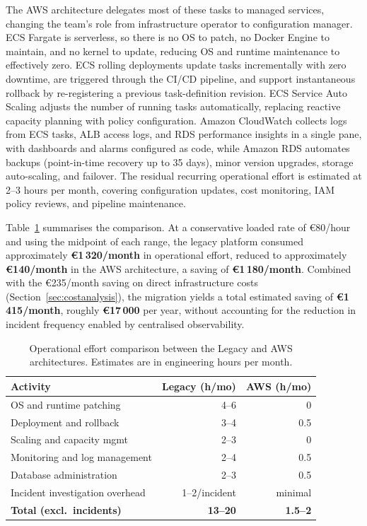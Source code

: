The AWS architecture delegates most of these tasks to managed services, changing the team's role from infrastructure operator to configuration manager. ECS Fargate is serverless, so there is no OS to patch, no Docker Engine to maintain, and no kernel to update, reducing OS and runtime maintenance to effectively zero. ECS rolling deployments update tasks incrementally with zero downtime, are triggered through the CI/CD pipeline, and support instantaneous rollback by re-registering a previous task-definition revision. ECS Service Auto Scaling adjusts the number of running tasks automatically, replacing reactive capacity planning with policy configuration. Amazon CloudWatch collects logs from ECS tasks, ALB access logs, and RDS performance insights in a single pane, with dashboards and alarms configured as code, while Amazon RDS automates backups (point-in-time recovery up to 35 days), minor version upgrades, storage auto-scaling, and failover. The residual recurring operational effort is estimated at 2--3 hours per month, covering configuration updates, cost monitoring, IAM policy reviews, and pipeline maintenance.

Table~\ref{tab:operational_effort} summarises the comparison. At a conservative loaded rate of €80/hour and using the midpoint of each range, the legacy platform consumed approximately \textbf{€1\,320/month} in operational effort, reduced to approximately \textbf{€140/month} in the AWS architecture, a saving of \textbf{€1\,180/month}. Combined with the €235/month saving on direct infrastructure costs (Section~\ref{sec:costanalysis}), the migration yields a total estimated saving of \textbf{€1\,415/month}, roughly \textbf{€17\,000} per year, without accounting for the reduction in incident frequency enabled by centralised observability.

\begin{table}[H]
  \centering
  \caption{Operational effort comparison between the Legacy and AWS
  architectures. Estimates are in engineering hours per month.}
  \label{tab:operational_effort}
  \small
  \begin{tabular}{lrr}
    \toprule
    \textbf{Activity} & \textbf{Legacy (h/mo)} & \textbf{AWS (h/mo)} \\
    \midrule
    OS and runtime patching      & 4--6  & 0   \\
    Deployment and rollback      & 3--4  & 0.5 \\
    Scaling and capacity mgmt    & 2--3  & 0   \\
    Monitoring and log management& 2--4  & 0.5 \\
    Database administration      & 2--3  & 0.5 \\
    Incident investigation overhead & 1--2/incident & minimal \\
    \midrule
    \textbf{Total (excl.\ incidents)} & \textbf{13--20} & \textbf{1.5--2} \\
    \bottomrule
  \end{tabular}
\end{table}

